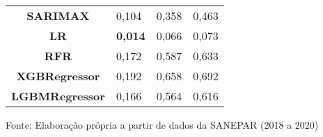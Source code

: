 \begin{table}[H]
\begin{tabular}{@{}clll@{}}
\textbf{SARIMAX}                  & 0,104                             & 0,358                            & 0,463                             \\
\textbf{LR}                       & \textbf{0,014}                             & 0,066                            & 0,073                             \\
\textbf{RFR}                      & 0,172                             & 0,587                            & 0,633                             \\
\textbf{XGBRegressor}             & 0,192                             & 0,658                            & 0,692                             \\
\textbf{LGBMRegressor}            & 0,166                             & 0,564                            & 0,616                             \\ \bottomrule
	\end{tabular}

Fonte: Elaboração própria a partir de dados da SANEPAR (2018 a 2020)
\end{table}

